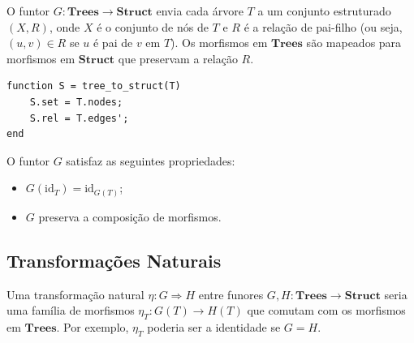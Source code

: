 O funtor $G: \mathbf{Trees} \to \mathbf{Struct}$ envia cada árvore $T$ a um conjunto estruturado $(X, R)$, onde $X$ é o conjunto de nós de $T$ e $R$ é a relação de pai-filho (ou seja, $(u, v) \in R$ se $u$ é pai de $v$ em $T$). Os morfismos em $\mathbf{Trees}$ são mapeados para morfismos em $\mathbf{Struct}$ que preservam a relação $R$.

\begin{lstlisting}[style=matlab, caption={Funtor $G$ aplicado a uma árvore}]
function S = tree_to_struct(T)
    S.set = T.nodes;
    S.rel = T.edges';
end
\end{lstlisting}

\begin{proposition}
O funtor $G$ satisfaz as seguintes propriedades:
\begin{itemize}
    \item $G(\mathrm{id}_T) = \mathrm{id}_{G(T)}$;
    \item $G$ preserva a composição de morfismos.
\end{itemize}
\end{proposition}

\subsection{Transformações Naturais}

Uma transformação natural $\eta: G \Rightarrow H$ entre funores $G, H: \mathbf{Trees} \to \mathbf{Struct}$ seria uma família de morfismos $\eta_T: G(T) \to H(T)$ que comutam com os morfismos em $\mathbf{Trees}$. Por exemplo, $\eta_T$ poderia ser a identidade se $G = H$.
